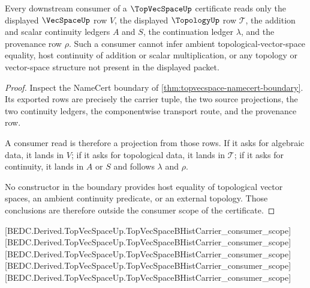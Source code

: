 \begin{theorem}
\label{thm:topvecspace-consumer-scope}
Every downstream consumer of a $\TopVecSpaceUp$ certificate reads only the displayed $\VecSpaceUp$ row $V$, the displayed $\TopologyUp$ row $\mathcal T$, the addition and scalar continuity ledgers $A$ and $S$, the continuation ledger $\lambda$, and the provenance row $\rho$. Such a consumer cannot infer ambient topological-vector-space equality, host continuity of addition or scalar multiplication, or any topology or vector-space structure not present in the displayed packet.
\end{theorem}
\begin{proof}
Inspect the NameCert boundary of \autoref{thm:topvecspace-namecert-boundary}. Its exported rows are precisely the carrier tuple, the two source projections, the two continuity ledgers, the componentwise transport route, and the provenance row.

A consumer read is therefore a projection from those rows. If it asks for algebraic data, it lands in $V$; if it asks for topological data, it lands in $\mathcal T$; if it asks for continuity, it lands in $A$ or $S$ and follows $\lambda$ and $\rho$.

No constructor in the boundary provides host equality of topological vector spaces, an ambient continuity predicate, or an external topology. Those conclusions are therefore outside the consumer scope of the certificate.
\end{proof}

[BEDC.Derived.TopVecSpaceUp.TopVecSpaceBHistCarrier\_consumer\_scope]
[BEDC.Derived.TopVecSpaceUp.TopVecSpaceBHistCarrier\_consumer\_scope]
[BEDC.Derived.TopVecSpaceUp.TopVecSpaceBHistCarrier\_consumer\_scope]
[BEDC.Derived.TopVecSpaceUp.TopVecSpaceBHistCarrier\_consumer\_scope]
[BEDC.Derived.TopVecSpaceUp.TopVecSpaceBHistCarrier\_consumer\_scope]

